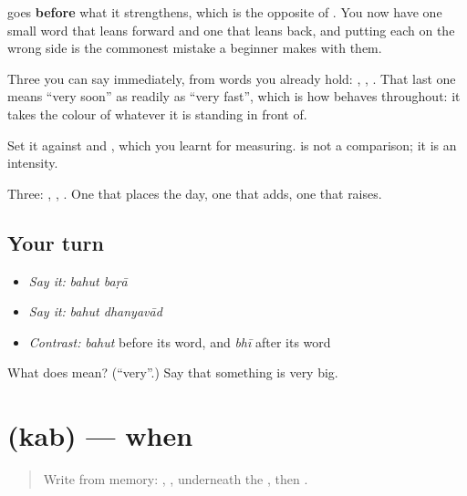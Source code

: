  goes \textbf{before} what it strengthens, which is the opposite of . You now have one small word that leans forward and one that leans back, and putting each on the wrong side is the commonest mistake a beginner makes with them.

Three you can say immediately, from words you already hold: \textbf{ }, \textbf{ }, \textbf{ }. That last one means \textquotedblleft{}very soon\textquotedblright{} as readily as \textquotedblleft{}very fast\textquotedblright{}, which is how  behaves throughout: it takes the colour of whatever it is standing in front of.

Set it against \textbf{} and \textbf{}, which you learnt for measuring.  is not a comparison; it is an intensity.

\begin{grammarlens}[title={What you've built}]
Three: , , . One that places the day, one that adds, one that raises.
\end{grammarlens}

\subsection*{Your turn}
\begin{itemize}
\raggedright
  \item \emph{Say it:} \emph{bahut baṛā}
  \item \emph{Say it:} \emph{bahut dhanyavād}
  \item \emph{Contrast:} \emph{bahut} before its word, and \emph{bhī} after its word
\end{itemize}

\begin{tcolorbox}[breakable,colback=teal!4,colframe=teal!35!black,title={Before you move on}]
What does  mean? (\textquotedblleft{}very\textquotedblright{}.) Say that something is very big.
\end{tcolorbox}
\section[kab]{ (kab) — when}

\label{lesson:HI-C71-when}



\begin{quote}
Write \textbf{} from memory: , ,  underneath the , then .
\end{quote}


